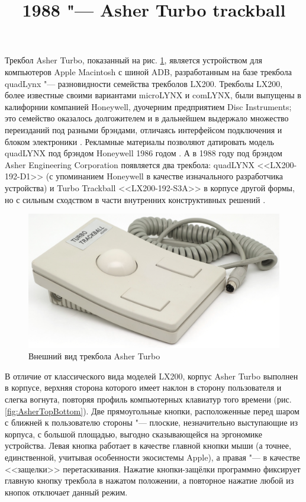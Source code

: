 \documentclass[11pt, a4paper]{article}
\begin{document}
\title{1988 "--- Asher Turbo trackball}
\date{}
\maketitle
{}
Трекбол Asher Turbo, показанный на рис. \ref{fig:AsherPic}, является устройством для компьютеров Apple Macintosh с шиной ADB, разработанным на базе трекбола quadLynx "--- разновидности семейства трекболов LX200. Трекболы LX200, более известные своими вариантами microLYNX и comLYNX, были выпущены в калифорнии компанией Honeywell, дуочерним предприятием Disc Instruments; это семейство оказалось долгожителем и в дальнейшем выдержало множество переизданий под разными брэндами, отличаясь интерфейсом подключения и блоком электроники \cite{lx200}. Рекламные материалы позволяют датировать модель quadLYNX под брэндом Honeywell 1986 годом \cite{honeywell}. А в 1988 году под брэндом Asher Engineering Corporation появляется два трекбола: quadLYNX <<LX200-192-D1>> (с упоминанием Honeywell в качестве изначального разработчика устройства) \cite{asher} и Turbo Trackball <<LX200-192-S3A>> в корпусе другой формы, но с сильным сходством в части внутренних конструктивных решений \cite{turbo}.

\begin{figure}[h]
    \centering
    \includegraphics[scale=0.58]{1988_asher_turbo_trackball/pic_60.jpg}
    \caption{Внешний вид трекбола Asher Turbo}
    \label{fig:AsherPic}
\end{figure}

В отличие от классического вида моделей LX200, корпус Asher Turbo выполнен в корпусе, верхняя сторона которого имеет наклон в сторону пользователя и слегка вогнута, повторяя профиль компьютерных клавиатур того времени (рис. \ref{fig:AsherTopBottom}). Две прямоугольные кнопки, расположенные перед шаром с ближней к пользователю стороны "--- плоские, незначительно выступающие из корпуса, с большой площадью, выгодно сказывающейся на эргономике устройства. Левая кнопка работает в качестве главной кнопки мыши (а точнее, единственной, учитывая особенности экосистемы Apple), а правая "--- в качестве <<защелки>> перетаскивания. Нажатие кнопки-защёлки программно фиксирует главную кнопку трекбола в нажатом положении, а повторное нажатие любой из кнопок отключает данный режим.
\end{document}
